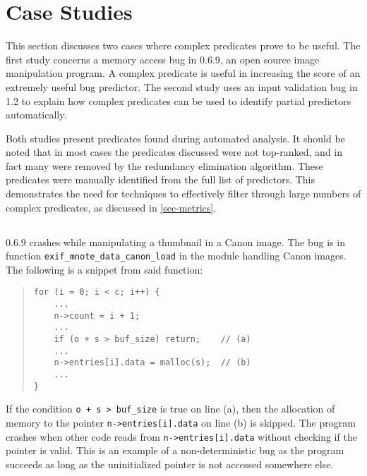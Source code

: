 
\section{Case Studies}
\label{sec-qual}
This section discusses two cases where complex predicates prove to be useful.  The first study concerns a memory access bug in  0.6.9, an open source image manipulation program.  A complex predicate is useful in increasing the score of an extremely useful bug predictor.  The second study uses an input validation bug in  1.2 to explain how complex predicates can be used to identify partial predictors automatically.

Both studies present predicates found during automated analysis.  It should be noted that in most cases the predicates discussed were not top-ranked, and in fact many were removed by the redundancy elimination algorithm.  These predicates were manually identified from the full list of predictors.  This demonstrates the need for techniques to effectively filter through large numbers of complex predicates, as discussed in \autoref{sec-metrics}.

\subsection{\large\textbf{}}
\label{sec-exif}

 0.6.9 crashes while manipulating a thumbnail in a Canon image.  The bug is in function \texttt{exif\_mnote\_data\_canon\_load} in the module handling Canon images.  The following is a snippet from said function:
\begin{quote}
\small
\begin{verbatim}
for (i = 0; i < c; i++) {
    ...
    n->count = i + 1;
    ...
    if (o + s > buf_size) return;    // (a)
    ...
    n->entries[i].data = malloc(s);  // (b)
    ...
}
\end{verbatim}
\end{quote}

If the condition \texttt{o + s > buf\_size} is true on line (a), then the allocation of memory to the pointer \texttt{n->entries[i].data} on line (b) is skipped.  The program crashes when other code reads from \texttt{n->entries[i].data} without checking if the pointer is valid.  This is an example of a non-deterministic bug as the program succeeds as long as the uninitialized pointer is not accessed somewhere else.

